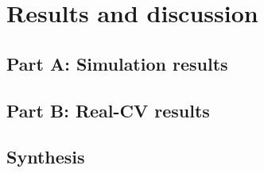 \section{Results and discussion}


\subsection{Part A: Simulation results}

\subsection{Part B: Real-CV results}

\subsection{Synthesis}
